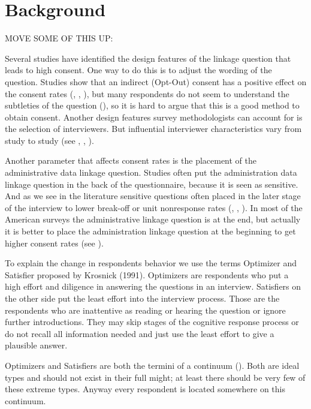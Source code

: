 \section{Background}

MOVE SOME OF THIS UP:

Several studies have identified the design features of the linkage question that leads to high consent. One way to do this is to adjust the wording of the question. Studies show that an indirect (Opt-Out) consent has a positive effect on the consent rates (\cite{Batesetal05}, \cite{Pascale11}, \cite{Dasetal14}), but many respondents do not seem to understand the subtleties of the question (\cite{Batesetal05}), so it is hard to argue that this is a good method to obtain consent. Another design features survey methodologists can account for is the selection of interviewers. But influential interviewer characteristics vary from study to study (see \cite{Beste11}, \cite{Sakshaugetal13}, \cite{Salaetal10}).

Another parameter that affects consent rates is the placement of the administrative data linkage question. Studies often put the administration data linkage question in the back of the questionnaire, because it is seen as sensitive. And as we see in the literature sensitive questions often placed in the later stage of the interview to lower break-off or unit nonresponse rates (\cite{Cantoretal02}, \cite{Sudmanetal82}, \cite{Tourangeauetal07}). In most of the American surveys the administrative linkage question is at the end, but actually it is better to place the administration linkage question at the beginning to get higher consent rates (see \cite{Sakshaugetal13}).


To explain the change in respondents behavior we use the terms Optimizer and Satisfier proposed by Krosnick (1991). Optimizers are respondents who put a high effort and diligence in answering the questions in an interview. Satisfiers on the other side put the least effort into the interview process. Those are the respondents who are inattentive as reading or hearing the question or ignore further introductions. They may skip stages of the cognitive response process or do not recall all information needed and just use the least effort to give a plausible answer.

Optimizers and Satisfiers are both the termini of a continuum (\cite{Krosnick99}). Both are ideal types and should not exist in their full might; at least there should be very few of these extreme types. Anyway every respondent is located somewhere on this continuum.

